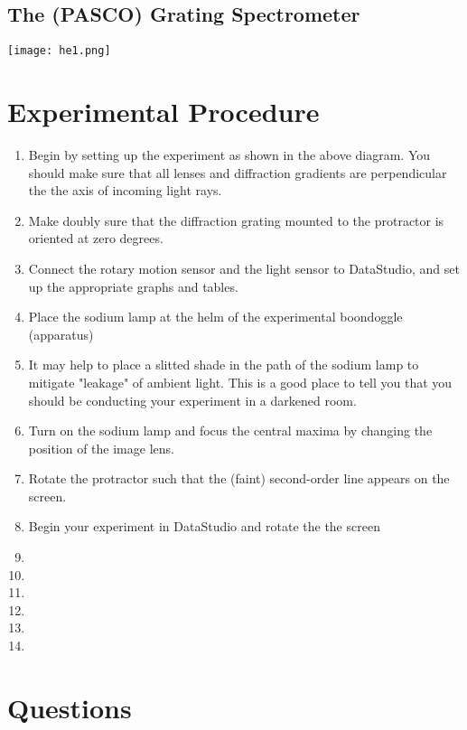 \documentclass{amsart}
\begin{document}
\subsection{The (PASCO) Grating Spectrometer}

\texttt{[image: he1.png]}


\section{Experimental Procedure}
\begin{enumerate}
\item Begin by setting up the experiment as shown in the above diagram. You should make sure that all lenses and diffraction gradients are perpendicular the the axis of incoming light rays. 
\item Make doubly sure that the diffraction grating mounted to the protractor is oriented at zero degrees. 
\item Connect the rotary motion sensor and the light sensor to DataStudio, and set up the appropriate graphs and tables. 
\item Place the sodium lamp at the helm of the experimental boondoggle (apparatus)
\item It may help to place a slitted shade in the path of the sodium lamp to mitigate "leakage" of ambient light. This is a good place to tell you that you should be conducting your experiment in a darkened room.
\item Turn on the sodium lamp and focus the central maxima by changing the position of the image lens. 
\item Rotate the protractor such that the (faint) second-order line appears on the screen. 
\item Begin your experiment in DataStudio and rotate the the screen 
\item
\item
\item
\item
\item
\item
\end{enumerate}

\section{}

\medskip

\pagebreak

\section{Questions}
\end{document}
